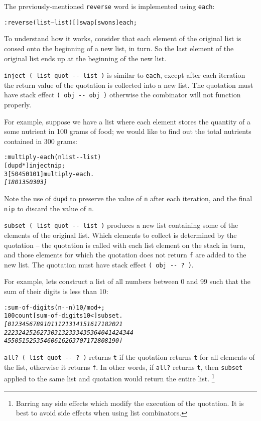 \documentclass[english]{article}
\begin{document}
The previously-mentioned \texttt{reverse} word is implemented using
\texttt{each}:
\begin{alltt}
: reverse ( list -- list ) {[} {]} swap {[} swons {]} each ;
\end{alltt}
To understand how it works, consider that each element of the original
list is consed onto the beginning of a new list, in turn. So the last
element of the original list ends up at the beginning of the new list.

\texttt{inject ( list quot -{}- list )} is similar to \texttt{each},
except after each iteration the return value of the quotation is collected into a new
list. The quotation must have stack effect
\texttt{( obj -{}- obj )} otherwise the combinator
will not function properly.

For example, suppose we have a list where each element stores the
quantity of a some nutrient in 100 grams of food; we would like to
find out the total nutrients contained in 300 grams:

\begin{alltt}
: multiply-each ( n list -{}- list )
    {[} dupd {*} {]} inject nip ;
3 {[} 50 450 101 {]} multiply-each .
\emph{{[} 180 1350 303 {]}}
\end{alltt}
Note the use of \texttt{dupd} to preserve the value of \texttt{n} after each iteration, and the final \texttt{nip} to discard the value of \texttt{n}.

\texttt{subset ( list quot -{}- list )} produces a new list containing
some of the elements of the original list. Which elements to collect
is determined by the quotation -- the quotation is called with each
list element on the stack in turn, and those elements for which the
quotation does not return \texttt{f} are added to the new list. The
quotation must have stack effect \texttt{( obj -{}- ?~)}.

For example, lets construct a list of all numbers between 0 and 99
such that the sum of their digits is less than 10:

\begin{alltt}
: sum-of-digits ( n -{}- n ) 10 /mod + ;
100 count {[} sum-of-digits 10 < {]} subset .
\emph{{[} 0 1 2 3 4 5 6 7 8 9 10 11 12 13 14 15 16 17 18 20 21}
\emph{22 23 24 25 26 27 30 31 32 33 34 35 36 40 41 42 43 44}
\emph{45 50 51 52 53 54 60 61 62 63 70 71 72 80 81 90 {]} }
\end{alltt}
\texttt{all? ( list quot -{}- ?~)} returns \texttt{t} if the quotation
returns \texttt{t} for all elements of the list, otherwise it returns
\texttt{f}. In other words, if \texttt{all?} returns \texttt{t}, then
\texttt{subset} applied to the same list and quotation would return
the entire list.%
\footnote{Barring any side effects which modify the execution of the quotation.
It is best to avoid side effects when using list combinators.%
}
\end{document}
